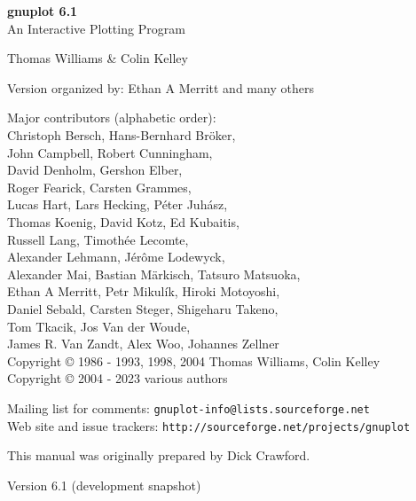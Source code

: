 \documentclass[10pt,twoside]{article}
\def\gpVersion{6.1}
\def\gnuplotVersion{\usebox\GpVersion}
\begin{document}
\sloppy
\thispagestyle{empty}
\rule{0in}{1.0in}

  \begin{center}

  {\huge\bf {gnuplot \gpVersion}}\\
  \vspace{3ex}
  {\Large An Interactive Plotting Program}\\

  \vspace{2ex}

  \large
  Thomas Williams \& Colin Kelley\\

  \vspace{2ex}

  Version
    {\gnuplotVersion }
  organized by: Ethan A Merritt and many others\\

   \vspace{2ex}

  Major contributors (alphabetic order):\\

  Christoph Bersch,
  Hans-Bernhard Bröker,\\
  John Campbell,
  Robert Cunningham,\\
  David Denholm,
  Gershon Elber,\\
  Roger Fearick,
  Carsten Grammes,\\
  Lucas Hart,
  Lars Hecking,
  Péter Juhász,\\
  Thomas Koenig,
  David Kotz,
  Ed Kubaitis,\\
  Russell Lang,
  Timothée Lecomte,\\
  Alexander Lehmann,
  Jérôme Lodewyck,\\
  Alexander Mai,
  Bastian Märkisch,
  Tatsuro Matsuoka, \\
  Ethan A Merritt,
  Petr Mikulík,
  Hiroki Motoyoshi, \\
  Daniel Sebald,
  Carsten Steger,
  Shigeharu Takeno,\\
  Tom Tkacik,
  Jos Van der Woude,\\
  James R. Van Zandt,
  Alex Woo,
  Johannes Zellner\\
  Copyright {\copyright} 1986 - 1993, 1998, 2004   Thomas Williams, Colin Kelley\\
  Copyright {\copyright} 2004 - 2023  various authors\\

  \vspace{2ex}

  Mailing list for comments: \verb+gnuplot-info@lists.sourceforge.net+\\
  Web site and issue trackers: \verb+http://sourceforge.net/projects/gnuplot+

  \vfill
  This manual was originally prepared by Dick Crawford. \\

  \vspace{2ex}

   Version {\gpVersion} (development snapshot)

   \end{center}
\newpage


\hypertarget{TableOfContents}{}
\tableofcontents

\newpage
\end{document}
